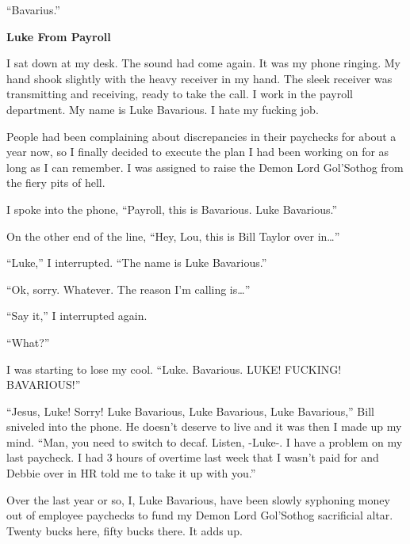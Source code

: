 ``Bavarius.'' 
 





{\bf Luke From Payroll}



I sat down at my desk. The sound had come again. It was my phone
ringing. My hand shook slightly with the heavy receiver in my hand.
The sleek receiver was transmitting and receiving, ready to take
the call. I work in the payroll department. My name is Luke
Bavarious. I hate my fucking job.



People had been complaining about discrepancies in their paychecks
for about a year now, so I finally decided to execute the plan I
had been working on for as long as I can remember. I was assigned
to raise the Demon Lord Gol'Sothog from the fiery pits of
hell.



I spoke into the phone, ``Payroll, this is Bavarious. Luke
Bavarious.''



On the other end of the line, ``Hey, Lou, this is Bill Taylor over
in{\ldots}''



``Luke,'' I interrupted. ``The name is Luke Bavarious.''



``Ok, sorry. Whatever. The reason I'm calling is{\ldots}''



``Say it,'' I interrupted again.



``What?''



I was starting to lose my cool. ``Luke. Bavarious. LUKE! FUCKING!
BAVARIOUS!''



``Jesus, Luke! Sorry! Luke Bavarious, Luke Bavarious, Luke
Bavarious,'' Bill sniveled into the phone. He doesn't deserve to
live and it was then I made up my mind. ``Man, you need to switch to
decaf. Listen, -Luke-. I have a problem on my last paycheck. I had
3 hours of overtime last week that I wasn't paid for and Debbie
over in HR told me to take it up with you.''



Over the last year or so, I, Luke Bavarious, have been slowly
syphoning money out of employee paychecks to fund my Demon Lord
Gol'Sothog sacrificial altar. Twenty bucks here, fifty bucks there.
It adds up.



